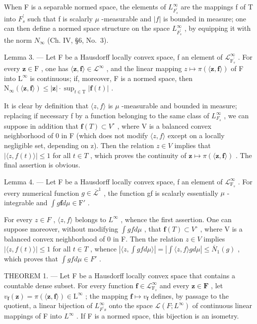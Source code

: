 When F is a separable normed space, the elements of \(L_{F_{s}^{\prime}}^{\infty}\) are the mappings f of T into \(F_{s}^{\prime}\) such that f is scalarly \(\mu\) -measurable and \(|f|\) is bounded in measure; one can then define a normed space structure on the space \(L_{F_{s}^{\prime}}^{\infty}\) , by equipping it with the norm \(N_{\infty}\) (Ch. IV, §6, No.~3).

Lemma 3. --- Let F be a Hausdorff locally convex space, f an element of \(\mathcal{L}_{\mathrm{F}_s^\prime}^\infty\) . For every \(\mathbf{z} \in \mathrm{F}\) , one has \(\langle \mathbf{z}, \mathbf{f} \rangle \in \mathcal{L}^\infty\) , and the linear mapping \(z \mapsto \pi(\langle \mathbf{z}, \mathbf{f} \rangle)\) of F into \(\mathrm{L}^\infty\) is continuous; if, moreover, F is a normed space, then \(\mathrm{N}_\infty(\langle \mathbf{z}, \mathbf{f} \rangle) \leqslant |\mathbf{z}| \cdot \sup_{t \in \mathrm{T}} |\mathbf{f}(t)|\) .

It is clear by definition that \(\langle z,f\rangle\) is \(\mu\) -measurable and bounded in measure; replacing if necessary f by a function belonging to the same class of \(L_{F_{s}}^{\infty}\) , we can suppose in addition that \(\mathbf{f}(T)\subset V^{\circ}\) , where V is a balanced convex neighborhood of 0 in F (which does not modify \(\langle z,f\rangle\) except on a locally negligible set, depending on z). Then the relation \(z\in V\) implies that \(|\langle z,f(t)\rangle|\leqslant1\) for all \(t\in T\) , which proves the continuity of \(\mathbf{z}\mapsto\pi(\langle\mathbf{z},\mathbf{f}\rangle)\) . The final assertion is obvious.

Lemma 4. --- Let F be a Hausdorff locally convex space, f an element of \(\mathcal{L}_{\mathrm{F}_s}^\infty\) . For every numerical function \(g \in \overline{\mathcal{L}}^1\) , the function gf is scalarly essentially \(\mu\) -integrable and \(\int g\mathbf{f} d\mu \in \mathrm{F}'\) .

For every \(z \in F\) , \(\langle z, f \rangle\) belongs to \(L^{\infty}\) , whence the first assertion. One can suppose moreover, without modifying \(\int g f d\mu\) , that \(\mathbf{f}(T) \subset V^{\circ}\) , where V is a balanced convex neighborhood of 0 in F. Then the relation \(z \in V\) implies \(|\langle z, f(t) \rangle| \leqslant 1\) for all \(t \in T\) , whence \(|\langle z, \int g f d\mu \rangle| = |\int \langle z, f \rangle g d\mu| \leqslant \overline{N}_{1}(g)\) , which proves that \(\int g f d\mu \in F'\) .

THEOREM 1. --- Let F be a Hausdorff locally convex space that contains a countable dense subset. For every function \(\mathbf{f} \in \mathcal{L}_{\mathrm{F}_s}^\infty\) and every \(\mathbf{z} \in \mathbf{F}\) , let \(v_{\mathbf{f}}(\mathbf{z}) = \pi (\langle \mathbf{z}, \mathbf{f} \rangle) \in \mathrm{L}^{\infty}\) ; the mapping \(\mathbf{f} \mapsto v_{\mathbf{f}}\) defines, by passage to the quotient, a linear bijection of \(L_{F^{\prime}s}^{\infty}\) onto the space \(\mathcal{L}(F;L^{\infty})\) of continuous linear mappings of F into \(L^{\infty}\) . If F is a normed space, this bijection is an isometry.


